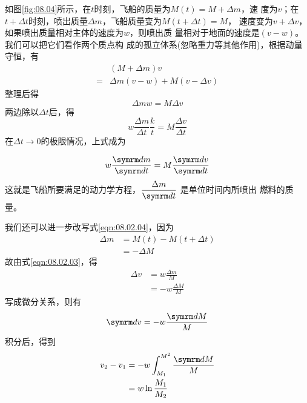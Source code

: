 如图\ref{fig:08.04}所示，在$ t $时刻，飞船的质量为$  M \left( t \right) = M + \Delta m $，速
度为$ v $；在$ t + \Delta t $时刻，喷出质量$ \Delta m $，飞船质量变为$ M \left( t + \Delta t \right) = M $，
速度变为$ v + \Delta v $，如果喷出质量相对主体的速度为$ w $，则喷出质
量相对于地面的速度是$ \left( v - w \right) $。我们可以把它们看作两个质点构
成的孤立体系(忽略重力等其他作用)，根据动量守恒，有
\begin{equation*}
  \begin{split}
    & \left( M + \Delta m \right) v \\
    = & \Delta m \left( v - w \right) + M \left( v - \Delta v \right)
  \end{split}
\end{equation*}
整理后得
\begin{equation}\label{eqn:08.02.03}
  \Delta m w = M \Delta v
\end{equation}
两边除以$ \Delta t $后，得
\begin{equation*}
  w \frac { \Delta m } { \Delta t } \frac { k } { t } = M \frac { \Delta v } { \Delta t }
\end{equation*}
在$ \Delta t \to 0 $的极限情况，上式成为

\mbox{}\vspace{-1.5em}
\begin{equation}\label{eqn:08.02.04}
  w \frac { \dif m } { \dif t } = M \frac { \dif v } { \dif t }
\end{equation}
这就是飞船所要满足的动力学方程，$ \dfrac { \Delta m } { \dif t } $
是单位时间内所喷出
燃料的质量。

我们还可以进一步改写式\eqref{eqn:08.02.04}，因为
\begin{equation*}
  \begin{split}
    \Delta m & = M \left( t \right) - M \left( t + \Delta t \right) \\
    & = - \Delta M
  \end{split}
\end{equation*}
故由式\eqref{eqn:08.02.03}，得
\begin{equation*}
  \begin{split}
    \Delta v &= w \frac { \Delta m } { M } \\
    & = - w \frac { \Delta M } { M }
  \end{split}
\end{equation*}
写成微分关系，则有
\begin{equation*}
  \dif v = - w \frac { \dif M } { M }
\end{equation*}
积分后，得到
\begin{equation*}
  \begin{split}
    v _ { 2 } - v _ { 1 } & = - w \int _ { M _ { 1 } } ^ { M ^ { 2 } } \frac { \dif M } { M } \\
    & = w \ln \frac { M _ { 1 } } { M _ { 2 } }
  \end{split}
\end{equation*}

